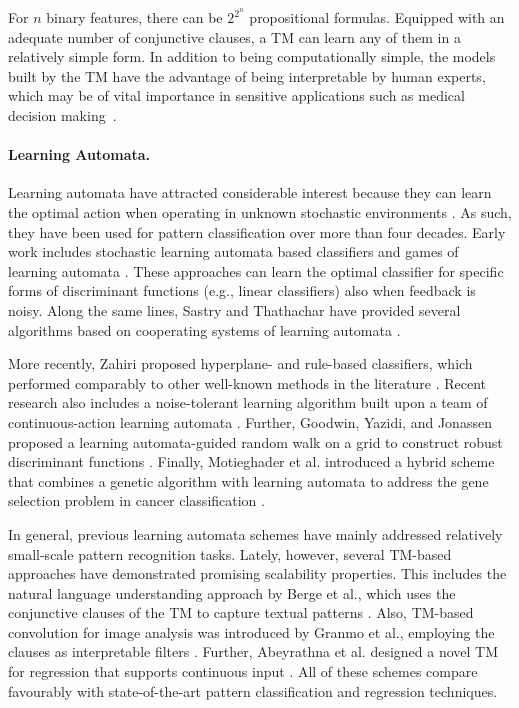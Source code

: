 \documentclass[letterpaper]{article}
\begin{document}
For $n$ binary features, there can be $2^{2^n}$ propositional formulas. Equipped with an adequate number of conjunctive clauses, a TM can learn any of them in a relatively simple form. In addition to being computationally simple, the models built by the TM have the advantage of being interpretable by human experts, which may be of vital importance in sensitive applications such as medical decision making~\cite{berge2019,Rudin2019}.

\paragraph{Learning Automata.}
Learning automata have attracted considerable interest because they can learn the optimal action when operating in unknown stochastic environments \cite{thathachar1987learning}. As such, they have been used for pattern classification over more than four decades. Early work includes stochastic learning automata based classifiers and games of learning automata \cite{barto1985pattern,thathachar1987learning}. These approaches can learn the optimal classifier for specific forms of discriminant functions (e.g., linear classifiers) also when feedback is noisy. Along the same lines, Sastry and Thathachar have provided several algorithms based on cooperating systems of learning automata \cite{sastry1999learning}. 

More recently, Zahiri proposed hyperplane- and rule-based classifiers, which performed comparably to other well-known methods in the literature \cite{zahiri2008learning,zahiri2012classification}. Recent research also includes a noise-tolerant learning algorithm built upon a team of continuous-action learning automata \cite{sastry2009team}. Further, Goodwin, Yazidi, and Jonassen proposed a learning automata-guided random walk on a grid to construct robust discriminant functions \cite{goodwin2016distributed}. Finally, Motieghader et al. introduced a hybrid scheme that combines a genetic algorithm with learning automata to address the gene selection problem in cancer classification \cite{motieghader2017hybrid}. 

In general, previous learning automata schemes have mainly addressed relatively small-scale pattern recognition tasks. Lately, however, several TM-based approaches have demonstrated promising scalability properties. This includes the natural language understanding approach by Berge et al., which uses the conjunctive clauses of the TM to capture textual patterns \cite{berge2019}. Also, TM-based convolution for image analysis was introduced by Granmo et al., employing the clauses as interpretable filters \cite{granmo2019convtsetlin}. Further, Abeyrathna et al. designed a novel TM for regression \cite{abeyrathna2019regressiontsetlin} that supports continuous input \cite{abeyrathna2019scheme}. All of these schemes compare favourably with state-of-the-art pattern classification and regression techniques.
\end{document}
